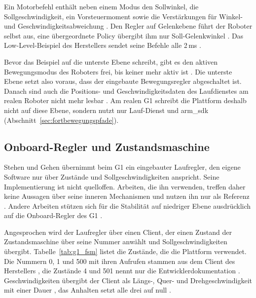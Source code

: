 Ein Motorbefehl enthält neben einem Modus den Sollwinkel, die Sollgeschwindigkeit, ein Vorsteuermoment sowie die Verstärkungen für Winkel- und Geschwindigkeitsabweichung .
Den Regler auf Gelenkebene führt der Roboter selbst aus, eine übergeordnete Policy übergibt ihm nur Soll-Gelenkwinkel \cite{Luo2026}.
Das Low-Level-Beispiel des Herstellers sendet seine Befehle alle 2\,ms .

Bevor das Beispiel auf die unterste Ebene schreibt, gibt es den aktiven Bewegungsmodus des Roboters frei, bis keiner mehr aktiv ist .
Die unterste Ebene setzt also voraus, dass der eingebaute Bewegungsregler abgeschaltet ist.
Danach sind auch die Positions- und Geschwindigkeitsdaten des Laufdienstes am realen Roboter nicht mehr lesbar \cite{UnitreeMujoco}.
Am realen G1 schreibt die Plattform deshalb nicht auf diese Ebene, sondern nutzt nur Lauf-Dienst und arm\_sdk (Abschnitt~\ref{sec:fortbewegungspfade}).

\subsection{Onboard-Regler und Zustandsmaschine}
\label{sec:g1_onboard}
Stehen und Gehen übernimmt beim G1 ein eingebauter Laufregler, den eigene Software nur über Zustände und Sollgeschwindigkeiten anspricht.
Seine Implementierung ist nicht quelloffen. Arbeiten, die ihn verwenden, treffen daher keine Aussagen über seine inneren Mechanismen und nutzen ihn nur als Referenz \cite{Hu2026}.
Andere Arbeiten stützen sich für die Stabilität auf niedriger Ebene ausdrücklich auf die Onboard-Regler des G1 \cite{Durrani2026}.

Angesprochen wird der Laufregler über einen Client, der einen Zustand der Zustandsmaschine über seine Nummer anwählt und Sollgeschwindigkeiten übergibt.
Tabelle~\ref{tab:g1_fsm} listet die Zustände, die die Plattform verwendet.
Die Nummern 0, 1 und 500 mit ihren Aufrufen stammen aus dem Client des Herstellers , die Zustände 4 und 501 nennt nur die Entwicklerdokumentation .
Geschwindigkeiten übergibt der Client als Längs-, Quer- und Drehgeschwindigkeit mit einer Dauer , das Anhalten setzt alle drei auf null .

